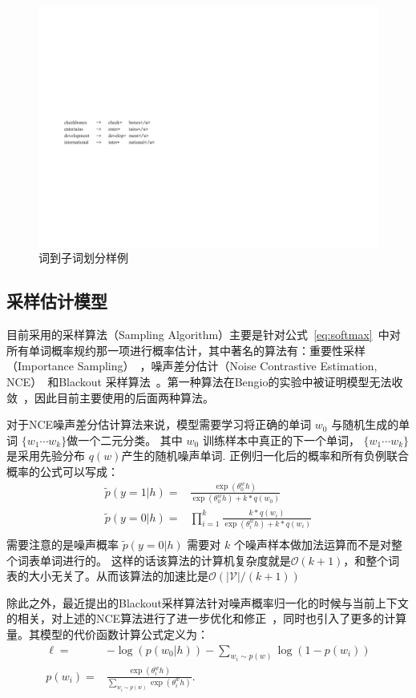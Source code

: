 \begin{figure}[!h]
  \centering
\includegraphics[width=0.6\linewidth]{./figures/subword.pdf}
\caption{词到子词划分样例}\label{fig:subword}
\end{figure}

\subsection{采样估计模型}
目前采用的采样算法（Sampling Algorithm）主要是针对公式~\ref{eq:softmax}~中对所有单词概率规约那一项进行概率估计，其中著名的算法有：重要性采样（Importance Sampling）~，噪声差分估计（Noise Contrastive Estimation, NCE）~和Blackout 采样算法~。第一种算法在Bengio的实验中被证明模型无法收敛~，因此目前主要使用的后面两种算法。

对于NCE噪声差分估计算法来说，模型需要学习将正确的单词 $w_0$ 与随机生成的单词 $\{w_1\cdots w_k\}$做一个二元分类。 其中 $w_0$ 训练样本中真正的下一个单词， $\{w_1\cdots w_k\}$ 是采用先验分布  $q(w)$产生的随机噪声单词. 正例归一化后的概率和所有负例联合概率的公式可以写成：
\begin{equation}\label{equ:nce}
\begin{split}
  \tilde{p}(y=1|h)=&\frac{\exp( \theta^w_0 h)}{ \exp( \theta^w_0 h)+k *q(w_0)}\\
  \tilde{p}(y=0|h)=&\prod_{i=1}^{k}\frac{k *q(w_i)}{\exp( \theta^w_i h)+k *q(w_i)}\\
\end{split}
\end{equation}
需要注意的是噪声概率 $\tilde{p}(y=0|h)$ 需要对 $k$ 个噪声样本做加法运算而不是对整个词表单词进行的。 这样的话该算法的计算机复杂度就是$\mathcal{O}(k+1)$，和整个词表的大小无关了。从而该算法的加速比是$\mathcal{O}(\mathcal{|V|}/(k+1))$

除此之外，最近提出的Blackout采样算法针对噪声概率归一化的时候与当前上下文的相关，对上述的NCE算法进行了进一步优化和修正~，同时也引入了更多的计算量。其模型的代价函数计算公式定义为：
\begin{equation}
\begin{split}
  \ell=&-\log(p(w_0|h)) - \sum_{w_i \sim p(w)} \log(1 - p(w_i))\\
p(w_i) =& \frac{\exp(\theta^w_i h)}{\sum_{w_i \sim p(w)} \exp(\theta^w_i h)}.
\end{split}
\end{equation}

